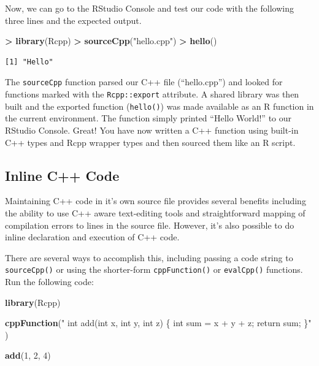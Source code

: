 \documentclass[]{krantz}
\makeatletter
\newenvironment{Shaded}{\begin{snugshade}}{\end{snugshade}}
\newcommand{\KeywordTok}[1]{\textcolor[rgb]{0.27,0.27,0.27}{\textbf{#1}}}
\newcommand{\DecValTok}[1]{\textcolor[rgb]{0.06,0.06,0.06}{#1}}
\newcommand{\StringTok}[1]{\textcolor[rgb]{0.5,0.5,0.5}{#1}}
\newcommand{\OperatorTok}[1]{\textcolor[rgb]{0.43,0.43,0.43}{\textbf{#1}}}
\newcommand{\NormalTok}[1]{#1}
\newenvironment{kframe}{%
\medskip{}
\setlength{\fboxsep}{.8em}
 \def\at@end@of@kframe{}%
 \ifinner\ifhmode%
  \def\at@end@of@kframe{\end{minipage}}%
  \begin{minipage}{\columnwidth}%
 \fi\fi%
 \def\FrameCommand##1{\hskip\@totalleftmargin \hskip-\fboxsep
 \colorbox{shadecolor}{##1}\hskip-\fboxsep
     \hskip-\linewidth \hskip-\@totalleftmargin \hskip\columnwidth}%
 \MakeFramed {\advance\hsize-\width
   \@totalleftmargin\z@ \linewidth\hsize
   \@setminipage}}%
 {\par\unskip\endMakeFramed%
 \at@end@of@kframe}
\renewenvironment{Shaded}{\begin{kframe}}{\end{kframe}}
\makeatother
\begin{document}
Now, we can go to the RStudio Console and test our code with the
following three lines and the expected output.

\begin{Shaded}
\begin{Highlighting}[]
\OperatorTok{>}\StringTok{ }\KeywordTok{library}\NormalTok{(Rcpp)}
\OperatorTok{>}\StringTok{ }\KeywordTok{sourceCpp}\NormalTok{(}\StringTok{"hello.cpp"}\NormalTok{)}
\OperatorTok{>}\StringTok{ }\KeywordTok{hello}\NormalTok{()}
\end{Highlighting}
\end{Shaded}

\begin{verbatim}
[1] "Hello"
\end{verbatim}

The \texttt{sourceCpp} function parsed our C++ file (``hello.cpp'') and
looked for functions marked with the \texttt{Rcpp::export} attribute. A
shared library was then built and the exported function
(\texttt{hello()}) was made available as an R function in the current
environment. The function simply printed ``Hello World!'' to our RStudio
Console. Great! You have now written a C++ function using built-in C++
types and Rcpp wrapper types and then sourced them like an R script.

\subsection{Inline C++ Code}\label{inline-c-code}

Maintaining C++ code in it's own source file provides several benefits
including the ability to use C++ aware text-editing tools and
straightforward mapping of compilation errors to lines in the source
file. However, it's also possible to do inline declaration and execution
of C++ code.

There are several ways to accomplish this, including passing a code
string to \texttt{sourceCpp()} or using the shorter-form
\texttt{cppFunction()} or \texttt{evalCpp()} functions. Run the
following code:

\begin{Shaded}
\begin{Highlighting}[]
\KeywordTok{library}\NormalTok{(Rcpp)}

\KeywordTok{cppFunction}\NormalTok{(}\StringTok{"}
\StringTok{  int add(int x, int y, int z) \{}
\StringTok{    int sum = x + y + z;}
\StringTok{    return sum;}
\StringTok{  \}"}
\NormalTok{)}

\KeywordTok{add}\NormalTok{(}\DecValTok{1}\NormalTok{, }\DecValTok{2}\NormalTok{, }\DecValTok{4}\NormalTok{)}
\end{Highlighting}
\end{Shaded}
\end{document}
